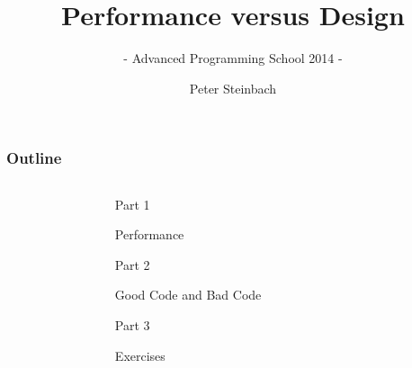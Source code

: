 \documentclass[9pt,xcolor=table]{beamer}
\begin{document}
     
 
 
\title[PerfVsDesign]{Performance versus Design}
\subtitle{- Advanced Programming School 2014 -}
\author[P. Steinbach]{Peter Steinbach}
\date{}
\addtocounter{framenumber}{-1}
\renewcommand*\inserttotalframenumber{59} 

 
{
\maketitle
}

\begin{frame}[t]
\frametitle{Outline}
\vspace{-1.5\baselineskip}
\vfill
  \begin{columns}[t]
    \begin{column}{.1\textwidth}
      \hfill
    \end{column}
    \begin{column}{.75\textwidth}
      \huge
      \vfill
      \begin{block}{Part 1}
        \begin{center}
          \huge%
          Performance
        \end{center}
      \end{block}
      \vfill
      \begin{block}{Part 2}
        \begin{center}
          \huge%
          Good Code and Bad Code
        \end{center}
      \end{block}
      \vfill
      \begin{block}{Part 3}
        \begin{center}
          \huge%
          Exercises
        \end{center}
      \end{block}
      \vfill
    \end{column}
    \begin{column}{.1\textwidth}
      \hfill
    \end{column}
  \end{columns}
\vfill
\end{frame}

\end{document}

